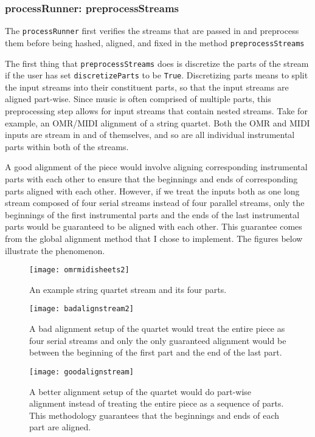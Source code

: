 \subsubsection{processRunner: preprocessStreams}\label{processrunner1}
The \texttt{processRunner} first verifies the streams that are passed in and preprocess them before being hashed, aligned, and fixed in the method \texttt{preprocessStreams}

The first thing that \texttt{preprocessStreams} does is discretize the parts of the stream if the user has set \texttt{discretizeParts} to be \texttt{True}. Discretizing parts means to split the input streams into their constituent parts, so that the input streams are aligned part-wise. Since music is often comprised of multiple parts, this preprocessing step allows for input streams that contain nested streams. Take for example, an OMR/MIDI alignment of a string quartet. Both the OMR and MIDI inputs are stream in and of themselves, and so are all individual instrumental parts within both of the streams. 

A good alignment of the piece would involve aligning corresponding instrumental parts with each other to ensure that the beginnings and ends of corresponding parts aligned with each other. However, if we treat the inputs both as one long stream composed of four serial streams instead of four parallel streams, only the beginnings of the first instrumental parts and the ends of the last instrumental parts would be guaranteed to be aligned with each other. This guarantee comes from the global alignment method that I chose to implement. The figures below illustrate the phenomenon. 

\begin{figure}[!h]
\centering
\texttt{[image: omrmidisheets2]}
\caption{An example string quartet stream and its four parts.}
\vspace{10mm}
\texttt{[image: badalignstream2]}
\caption[A bad alignment setup] {A bad alignment setup of the quartet would treat the entire piece as four serial streams and only the only guaranteed alignment would be between the beginning of the first part and the end of the last part.}
\vspace{10mm}
\texttt{[image: goodalignstream]}
\caption[A better alignment setup] {A better alignment setup of the quartet would do part-wise alignment instead of treating the entire piece as a sequence of parts. This methodology guarantees that the beginnings and ends of each part are aligned.}
\end{figure}

